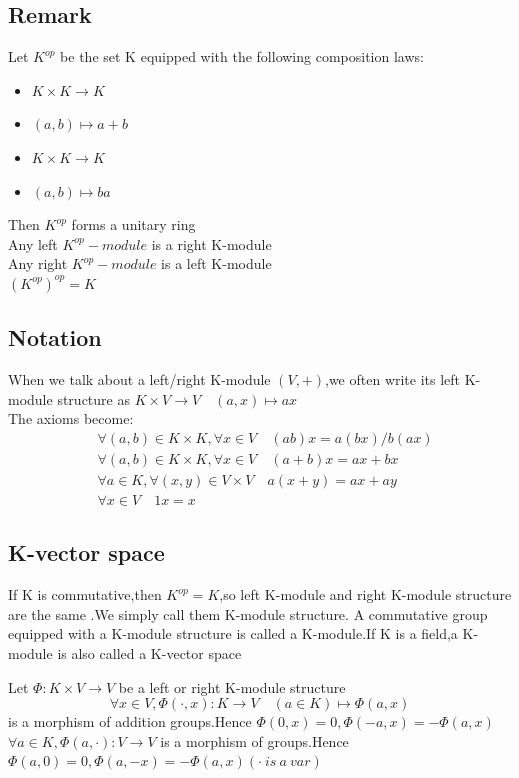 \documentclass{book}
\begin{document}
\subsection{Remark}\quad Let $K^{op}$ be the set K equipped with the following composition laws:
\begin{itemize}
    \item $K\times K\rightarrow K$
    \item $(a,b)\mapsto a+b$
    \item $K\times K\rightarrow K$
    \item $(a,b)\mapsto ba$
\end{itemize}
Then $K^{op}$ forms a unitary ring\\
Any left $K^{op}-module$ is a right K-module\\
Any right $K^{op}-module$ is a left K-module\\
$(K^{op})^{op}=K$
\subsection{Notation}

When we talk about a left/right K-module $(V,+)$,we often write its left K-module structure as $K\times V\rightarrow V\quad (a,x)\mapsto ax$\\
\indent The axioms become:\begin{align*}
    &\forall(a,b)\in K\times K,\forall x\in V\quad (ab)x=a(bx)/b(ax)\\
    &\forall(a,b)\in K\times K,\forall x\in V\quad (a+b)x=ax+bx\\
    &\forall a\in K,\forall(x,y)\in V\times V\quad a(x+y)=ax+ay\\
    &\forall x\in V\quad 1x=x
\end{align*}
\subsection{K-vector space}

If K is commutative,then $K^{op}=K$,so left K-module and right K-module structure are the same .We simply call them K-module structure. A commutative group equipped with a K-module structure is called a K-module.If K is a field,a K-module is also called a K-vector space

Let $\Phi:K\times V\rightarrow V$ be a left or right K-module structure$$\forall x\in V,\Phi(\cdot,x):K\rightarrow V\quad(a\in K)\mapsto\Phi(a,x)$$\indent is a morphism of addition groups.Hence $\Phi(0,x)=0,\Phi(-a,x)=-\Phi(a,x)$\\
$\forall a\in K,\Phi(a,\cdot):V\rightarrow V$ is a morphism of groups.Hence $\Phi(a,0)=0,\Phi(a,-x)=-\Phi(a,x)(\cdot \ is\ a\ var)$
\end{document}

